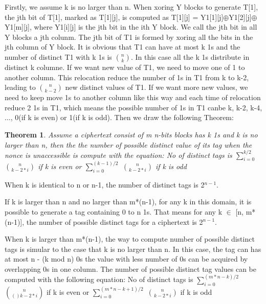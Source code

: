 \documentclass{article}
\newtheorem{theorem}{Theorem}[section]
\begin{document}
Firstly, we assume k is no larger than n. When xoring Y blocks to generate T[1], the jth bit of T[1], marked as T[1][j], is computed as T[1][j] = Y1[1][j]$\oplus$Y1[2][j]$\oplus$Y1[m][j], where Y1[i][j] is the jth bit in the ith Y block. We call the jth bit in all Y blocks a jth colunm. The jth bit of T1 is formed by xoring all the bits in the jth column of Y block.  It is obvious that T1 can have at most k 1s and the number of distinct T1 with k 1s is $\binom{n}{k}$. In this case all the k 1s distribute in distinct k columne.  If we want new value of T1, we need to move one of 1 to another column. This relocation reduce the number of 1s in T1 from k to k-2, leading to $\binom{n}{k-2}$ new distinct values of T1. If we want more new values, we need to keep move 1s to another column like this way and each time of relocation reduce 2 1s in T1, which means the possible number of 1s in T1 canbe k, k-2, k-4,$\ldots$, 0(if k is even) or 1(if k is odd). Then we draw the following Theorem:
\begin{theorem}
Assume a ciphertext consist of m n-bits blocks has k 1s and k is no larger than n, then the the number of possible distinct value of its tag when the nonce is unaccessible is compute with the equation:
No of distinct tags is $\sum_{i=0}^{k/2}$ $\binom{n}{k-2*i}$ if k is even or $\sum_{i=0}^{(k-1)/2}$ $\binom{n}{k-2*i}$ if k is odd
\end{theorem}
When k is identical to n or n-1, the number of distinct tags is 2$^{n-1}$.  

If k is larger than n and no larger than m*(n-1), for any k in this domain, it is possible to generate a tag containing 0 to n 1s. That means for any k $\in$ [n, m*(n-1)], the number of possible distinct tags for a ciphertext is 2$^{n-1}$. 

When k is larger than m*(n-1), the way to compute number of possible distinct tags is simular to the case that k is no larger than n. In this case, the tag can has at most n - (k mod n) 0s the value with less number of 0s can be acquired by overlapping 0s in one column. The number of possible distinct tag values can be computed with the following equation:
No of distinct tags is $\sum_{i=0}^{(m*n-k)/2}$ $\binom{n}{()k-2*i}$ if k is even or $\sum_{i=0}^{(m*n-k+1)/2}$ $\binom{n}{k-2*i}$ if k is odd

\end{document}

